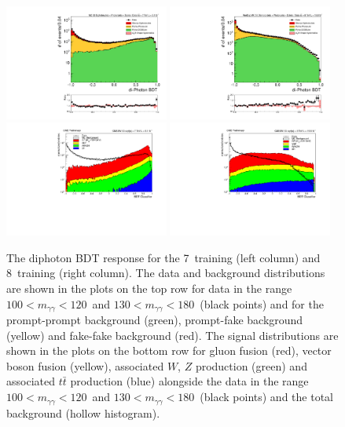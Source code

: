 \begin{figure}
  \includegraphics[width=0.48\textwidth]{selec_and_cats/plots/diphoBDT_7TeV_bkg.pdf}
  \includegraphics[width=0.48\textwidth]{selec_and_cats/plots/diphoBDT_8TeV_bkg.pdf} \\
  \includegraphics[width=0.48\textwidth]{selec_and_cats/plots/diphoBDT_7TeV_sig.pdf} 
  \includegraphics[width=0.48\textwidth]{selec_and_cats/plots/diphoBDT_8TeV_sig.pdf}
  \caption{The diphoton BDT response for the 7~\TeV training (left column) and 8~\TeV training (right column). The data and background distributions are shown in the plots on the top row for data in the range $100 < m_{\gamma\gamma} < 120$~\GeV and $130 < m_{\gamma\gamma} < 180$~\GeV (black points) and for the prompt-prompt background (green), prompt-fake background (yellow) and fake-fake background (red). The signal distributions are shown in the plots on the bottom row for gluon fusion (red), vector boson fusion (yellow), associated $W$, $Z$ production (green) and associated $t\bar{t}$ production (blue) alongside the data in the range $100 < m_{\gamma\gamma} < 120$~\GeV and $130 < m_{\gamma\gamma} < 180$~\GeV (black points) and the total background (hollow histogram). }
  \label{fig:dipho_bdt}
\end{figure}

